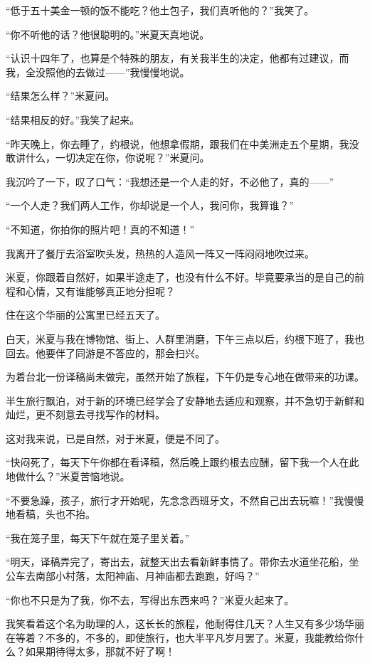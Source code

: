 \par “低于五十美金一顿的饭不能吃？他土包子，我们真听他的？”我笑了。
\par “你不听他的话？他很聪明的。”米夏天真地说。
\par “认识十四年了，也算是个特殊的朋友，有关我半生的决定，他都有过建议，而我，全没照他的去做过——”我慢慢地说。
\par “结果怎么样？”米夏问。
\par “结果相反的好。”我笑了起来。
\par “昨天晚上，你去睡了，约根说，他想拿假期，跟我们在中美洲走五个星期，我没敢讲什么，一切决定在你，你说呢？”米夏问。
\par 我沉吟了一下，叹了口气：“我想还是一个人走的好，不必他了，真的——”
\par “一个人走？我们两人工作，你却说是一个人，我问你，我算谁？”
\par “不知道，你拍你的照片吧！真的不知道！”
\par 我离开了餐厅去浴室吹头发，热热的人造风一阵又一阵闷闷地吹过来。
\par 米夏，你跟着自然好，如果半途走了，也没有什么不好。毕竟要承当的是自己的前程和心情，又有谁能够真正地分担呢？
\par 
\par 住在这个华丽的公寓里已经五天了。
\par 白天，米夏与我在博物馆、街上、人群里消磨，下午三点以后，约根下班了，我也回去。他要伴了同游是不答应的，那会扫兴。
\par 为着台北一份译稿尚未做完，虽然开始了旅程，下午仍是专心地在做带来的功课。
\par 半生旅行飘泊，对于新的环境已经学会了安静地去适应和观察，并不急切于新鲜和灿烂，更不刻意去寻找写作的材料。
\par 这对我来说，已是自然，对于米夏，便是不同了。
\par “快闷死了，每天下午你都在看译稿，然后晚上跟约根去应酬，留下我一个人在此地做什么？”米夏苦恼地说。
\par “不要急躁，孩子，旅行才开始呢，先念念西班牙文，不然自己出去玩嘛！”我慢慢地看稿，头也不抬。
\par “我在笼子里，每天下午就在笼子里关着。”
\par “明天，译稿弄完了，寄出去，就整天出去看新鲜事情了。带你去水道坐花船，坐公车去南部小村落，太阳神庙、月神庙都去跑跑，好吗？”
\par “你也不只是为了我，你不去，写得出东西来吗？”米夏火起来了。
\par 我笑看着这个名为助理的人，这长长的旅程，他耐得住几天？人生又有多少场华丽在等着？不多的，不多的，即使旅行，也大半平凡岁月罢了。米夏，我能教给你什么？如果期待得太多，那就不好了啊！
